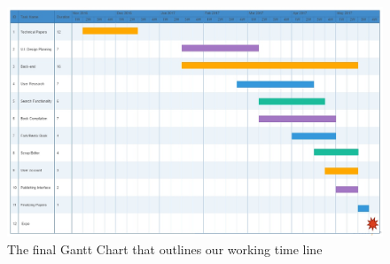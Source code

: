 \documentclass[onecolumn, draftclsnofoot,10pt, compsoc]{IEEEtran}
\begin{document}
\begin{figure}[th!]
	\centering
	\includegraphics[width=160mm]{ganttchart}
	\caption{The final Gantt Chart that outlines our working time line}
	\label{fig:ganttchart}
\end{figure}
\end{document}
